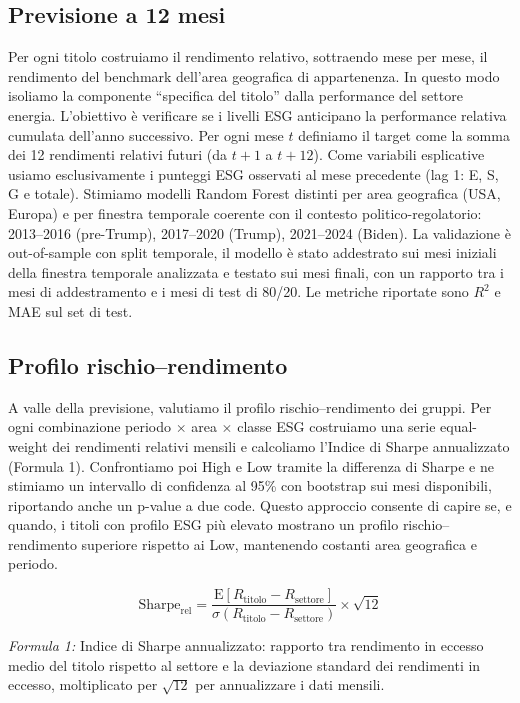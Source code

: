 \documentclass[12pt,a4paper]{article}
\begin{document}
\subsection{Previsione a 12 mesi}

Per ogni titolo costruiamo il rendimento relativo, sottraendo mese per mese, il rendimento del benchmark dell'area geografica di appartenenza. In questo modo isoliamo la componente ``specifica del titolo'' dalla performance del settore energia. L'obiettivo è verificare se i livelli ESG anticipano la performance relativa cumulata dell'anno successivo. Per ogni mese $t$ definiamo il target come la somma dei 12 rendimenti relativi futuri (da $t+1$ a $t+12$). Come variabili esplicative usiamo esclusivamente i punteggi ESG osservati al mese precedente (lag 1: E, S, G e totale). Stimiamo modelli Random Forest distinti per area geografica (USA, Europa) e per finestra temporale coerente con il contesto politico-regolatorio: 2013--2016 (pre-Trump), 2017--2020 (Trump), 2021--2024 (Biden). La validazione è out-of-sample con split temporale, il modello è stato addestrato sui mesi iniziali della finestra temporale analizzata e testato sui mesi finali, con un rapporto tra i mesi di addestramento e i mesi di test di 80/20. Le metriche riportate sono $R^2$ e MAE sul set di test.

\subsection{Profilo rischio--rendimento}

A valle della previsione, valutiamo il profilo rischio--rendimento dei gruppi. Per ogni combinazione periodo $\times$ area $\times$ classe ESG costruiamo una serie equal-weight dei rendimenti relativi mensili e calcoliamo l'Indice di Sharpe annualizzato (Formula 1). Confrontiamo poi High e Low tramite la differenza di Sharpe e ne stimiamo un intervallo di confidenza al 95\% con bootstrap sui mesi disponibili, riportando anche un p-value a due code. Questo approccio consente di capire se, e quando, i titoli con profilo ESG più elevato mostrano un profilo rischio--rendimento superiore rispetto ai Low, mantenendo costanti area geografica e periodo.

\[
\mathrm{Sharpe}_{\mathrm{rel}} =
\frac{\mathrm{E}[R_{\mathrm{titolo}} - R_{\mathrm{settore}}]}{\sigma(R_{\mathrm{titolo}} - R_{\mathrm{settore}})}\times\sqrt{12}
\]

\noindent\textit{Formula 1:} Indice di Sharpe annualizzato: rapporto tra rendimento in eccesso medio del titolo rispetto al settore e la deviazione standard dei rendimenti in eccesso, moltiplicato per $\sqrt{12}$ per annualizzare i dati mensili.
\end{document}
